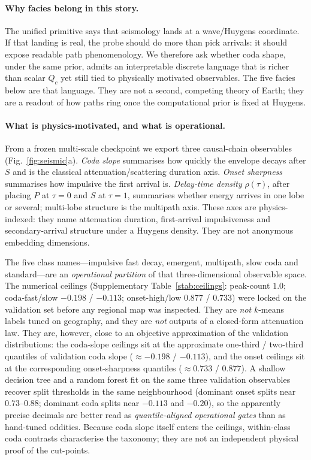 \documentclass[twocolumn,10pt]{article}
\begin{document}
\paragraph{Why facies belong in this story.}
The unified primitive says that seismology lands at a wave/Huygens coordinate.
If that landing is real, the probe should do more than pick arrivals: it should
expose readable path phenomenology. We therefore ask whether coda shape, under
the same prior, admits an interpretable discrete language that is richer than
scalar \(Q_c\) yet still tied to physically motivated observables. The five
facies below are that language. They are not a second, competing theory of
Earth; they are a readout of how paths ring once the computational prior is
fixed at Huygens.

\paragraph{What is physics-motivated, and what is operational.}
From a frozen multi-scale checkpoint we export three causal-chain observables
(Fig.~\ref{fig:seismic}a). \emph{Coda slope} summarises how quickly the envelope
decays after \(S\) and is the classical attenuation/scattering duration axis.
\emph{Onset sharpness} summarises how impulsive the first arrival is.
\emph{Delay-time density} \(\rho(\tau)\), after placing \(P\) at \(\tau=0\) and
\(S\) at \(\tau=1\), summarises whether energy arrives in one lobe or several;
multi-lobe structure is the multipath axis. These axes are physics-indexed: they
name attenuation duration, first-arrival impulsiveness and secondary-arrival
structure under a Huygens density. They are not anonymous embedding dimensions.

The five class names---impulsive fast decay, emergent, multipath, slow coda and
standard---are an \emph{operational partition} of that three-dimensional
observable space. The numerical ceilings
(Supplementary Table~\ref{stab:ceilings}: peak-count \(1.0\); coda-fast/slow
\(-0.198\) / \(-0.113\); onset-high/low \(0.877\) / \(0.733\)) were locked on
the validation set before any regional map was inspected. They are
\emph{not} \(k\)-means labels tuned on geography, and they are
\emph{not} outputs of a closed-form attenuation law. They are, however, close
to an objective approximation of the validation distributions: the coda-slope
ceilings sit at the approximate one-third / two-third quantiles of validation
coda slope (\(\approx-0.198\) / \(-0.113\)), and the onset ceilings sit at the
corresponding onset-sharpness quantiles (\(\approx0.733\) / \(0.877\)). A shallow
decision tree and a random forest fit on the same three validation observables
recover split thresholds in the same neighbourhood (dominant onset splits near
\(0.73\)--\(0.88\); dominant coda splits near \(-0.113\) and
\(-0.20\)), so the apparently precise decimals are better read as
\emph{quantile-aligned operational gates} than as hand-tuned oddities.
Because coda slope itself enters the ceilings, within-class coda contrasts
characterise the taxonomy; they are not an independent physical proof of the
cut-points.
\end{document}
